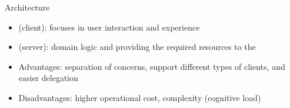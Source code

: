\begin{frame}{Architecture}
    \begin{itemize}
        \item \mlblinkui (client): focuses in user interaction and experience
        \item \mlblinkapi (server): domain logic and providing the required resources to the \mlblinkui
        \item Advantages: separation of concerns, support different types of clients, and easier delegation
        \item Disadvantages: higher operational cost, complexity (cognitive load)
    \end{itemize}
\end{frame}


